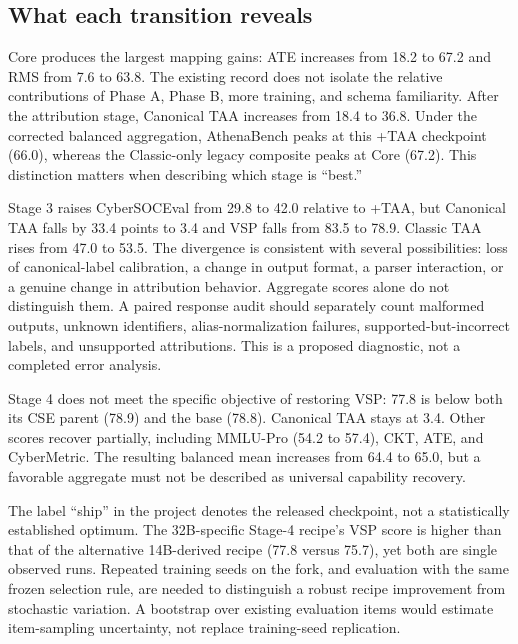 \documentclass[journal]{IEEEtran}
\begin{document}
\subsection{What each transition reveals}
Core produces the largest mapping gains: ATE increases from 18.2 to 67.2 and RMS from 7.6 to 63.8. The existing record does not isolate the relative contributions of Phase A, Phase B, more training, and schema familiarity. After the attribution stage, Canonical TAA increases from 18.4 to 36.8. Under the corrected balanced aggregation, AthenaBench peaks at this +TAA checkpoint (66.0), whereas the Classic-only legacy composite peaks at Core (67.2). This distinction matters when describing which stage is ``best.''

Stage 3 raises CyberSOCEval from 29.8 to 42.0 relative to +TAA, but Canonical TAA falls by 33.4 points to 3.4 and VSP falls from 83.5 to 78.9. Classic TAA rises from 47.0 to 53.5. The divergence is consistent with several possibilities: loss of canonical-label calibration, a change in output format, a parser interaction, or a genuine change in attribution behavior. Aggregate scores alone do not distinguish them. A paired response audit should separately count malformed outputs, unknown identifiers, alias-normalization failures, supported-but-incorrect labels, and unsupported attributions. This is a proposed diagnostic, not a completed error analysis.

Stage 4 does not meet the specific objective of restoring VSP: 77.8 is below both its CSE parent (78.9) and the base (78.8). Canonical TAA stays at 3.4. Other scores recover partially, including MMLU-Pro (54.2 to 57.4), CKT, ATE, and CyberMetric. The resulting balanced mean increases from 64.4 to 65.0, but a favorable aggregate must not be described as universal capability recovery.

The label ``ship'' in the project denotes the released checkpoint, not a statistically established optimum. The 32B-specific Stage-4 recipe's VSP score is higher than that of the alternative 14B-derived recipe (77.8 versus 75.7), yet both are single observed runs. Repeated training seeds on the fork, and evaluation with the same frozen selection rule, are needed to distinguish a robust recipe improvement from stochastic variation. A bootstrap over existing evaluation items would estimate item-sampling uncertainty, not replace training-seed replication.
\end{document}
